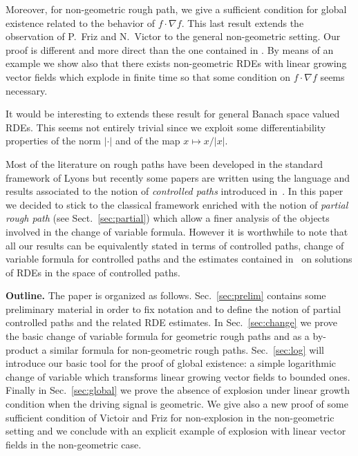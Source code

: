\documentclass[a4paper,12pt]{article}
\theoremstyle{definition}
\begin{document}
 Moreover, for non-geometric rough path, we give a sufficient condition for global existence  related to the behavior of $f\cdot \nabla f$. This last result extends the observation of P.~Friz and N.~Victor to the general non-geometric setting. Our proof is different
and more direct than the one contained in \cite{friz06c}.  By means of an example we show also that there exists non-geometric RDEs with linear growing vector fields which explode in finite time so that some condition on $f\cdot \nabla f$ seems necessary.

It would be interesting to extends these result for general Banach space valued RDEs. This seems not entirely trivial since we exploit some differentiability properties of the norm $|\cdot|$ and of the map $x \mapsto x/|x|$.



Most of the literature on rough paths have been developed in the standard framework of Lyons but recently some papers are written using the language and results associated to the notion of \emph{controlled paths} introduced in~\cite{gubinelli04a}. In this paper we decided to stick to the classical framework enriched with the notion of \emph{partial rough path} (see Sect.~\ref{sec:partial}) which allow a finer analysis of the objects involved in the change of variable formula. However it is worthwhile to note that all our results
can be equivalently stated in terms of controlled paths, change of variable formula for controlled paths and the estimates contained in~\cite{gubinelli04a} on solutions of RDEs in the space of controlled paths.   

\bigskip
\noindent\textbf{Outline.} The paper is organized as follows. Sec.~\ref{sec:prelim} contains some preliminary material in order to fix notation and to define the notion of partial controlled paths and the related RDE estimates. In Sec.~\ref{sec:change} we prove the basic change of variable formula for geometric rough paths and as a by-product a similar formula for non-geometric rough paths. Sec.~\ref{sec:log} will introduce our basic tool for the proof of global existence: a simple logarithmic change of variable which transforms linear growing vector fields to bounded ones. Finally in Sec.~\ref{sec:global} we prove the absence of explosion under linear growth condition when the driving signal is geometric. We give also a new proof of some sufficient condition of Victoir and Friz for non-explosion in the non-geometric setting and we conclude with an explicit example of explosion with linear vector fields in the non-geometric case.
\end{document}
